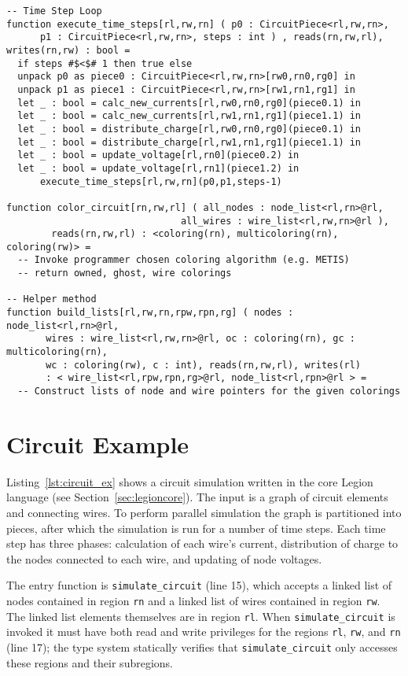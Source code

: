 \begin{lstlisting}[float={t},label={lst:circuit_ex},caption={Circuit Simulation}]
-- Time Step Loop
function execute_time_steps[rl,rw,rn] ( p0 : CircuitPiece<rl,rw,rn>, 
      p1 : CircuitPiece<rl,rw,rn>, steps : int ) , reads(rn,rw,rl), writes(rn,rw) : bool = 
  if steps #$<$# 1 then true else
  unpack p0 as piece0 : CircuitPiece<rl,rw,rn>[rw0,rn0,rg0] in 
  unpack p1 as piece1 : CircuitPiece<rl,rw,rn>[rw1,rn1,rg1] in
  let _ : bool = calc_new_currents[rl,rw0,rn0,rg0](piece0.1) in
  let _ : bool = calc_new_currents[rl,rw1,rn1,rg1](piece1.1) in
  let _ : bool = distribute_charge[rl,rw0,rn0,rg0](piece0.1) in
  let _ : bool = distribute_charge[rl,rw1,rn1,rg1](piece1.1) in
  let _ : bool = update_voltage[rl,rn0](piece0.2) in
  let _ : bool = update_voltage[rl,rn1](piece1.2) in
      execute_time_steps[rl,rw,rn](p0,p1,steps-1)

function color_circuit[rn,rw,rl] ( all_nodes : node_list<rl,rn>@rl, 
                               all_wires : wire_list<rl,rw,rn>@rl ), 
        reads(rn,rw,rl) : <coloring(rn), multicoloring(rn), coloring(rw)> =  
  -- Invoke programmer chosen coloring algorithm (e.g. METIS)
  -- return owned, ghost, wire colorings

-- Helper method
function build_lists[rl,rw,rn,rpw,rpn,rg] ( nodes : node_list<rl,rn>@rl, 
       wires : wire_list<rl,rw,rn>@rl, oc : coloring(rn), gc : multicoloring(rn), 
       wc : coloring(rw), c : int), reads(rn,rw,rl), writes(rl) 
       : < wire_list<rl,rpw,rpn,rg>@rl, node_list<rl,rpn>@rl > = 
  -- Construct lists of node and wire pointers for the given colorings
\end{lstlisting}

\section{Circuit Example}
\label{sec:example}

Listing~\ref{lst:circuit_ex} shows a circuit simulation written
in the core Legion language (see
Section~\ref{sec:legioncore}).  The input is a graph of circuit
elements and connecting wires.  To perform parallel
simulation the graph is partitioned into pieces, after which the
simulation is run for a number of time steps.  Each time step has
three phases: calculation of each wire's current, distribution of charge to
the nodes connected to each wire, and updating of node voltages.

The entry function is {\tt simulate\_circuit} (line 15), which accepts a 
linked list of nodes contained in region {\tt rn} and a linked list of 
wires contained in region {\tt rw}.  The linked list elements themselves
are in region {\tt rl}.
When {\tt simulate\_circuit} is invoked it must have both read and
write privileges for the regions {\tt rl}, {\tt rw}, and {\tt rn}
(line 17); the type system statically verifies that
{\tt simulate\_circuit} only accesses these regions and their subregions.

